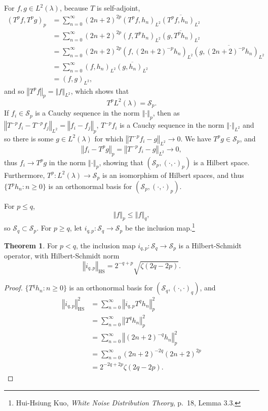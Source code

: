 \documentclass{article}
\newcommand{\norm}[1]{\left\Vert #1 \right\Vert}
\newcommand{\HS}[1]{\left\Vert #1 \right\Vert_{\mathrm{HS}}}
\theoremstyle{definition}
\newtheorem{theorem}{Theorem}
\theoremstyle{definition}
\begin{document}
For $f,g \in L^2(\lambda)$, because $T$ is self-adjoint,
\begin{align*}
(T^p f,T^p g)_p &=\sum_{n=0}^\infty (2n+2)^{2p} (T^p f,h_n)_{L^2} \overline{(T^p f,h_n)_{L^2}}\\
&=\sum_{n=0}^\infty (2n+2)^{2p} (f,T^p h_n)_{L^2} \overline{(g,T^p h_n)_{L^2}}\\
&=\sum_{n=0}^\infty (2n+2)^{2p} (f,(2n+2)^{-p} h_n)_{L^2} \overline{(g,(2n+2)^{-p} h_n)_{L^2}} \\
&=\sum_{n=0}^\infty (f,h_n)_{L^2} \overline{(g,h_n)_{L^2}}\\
&=(f,g)_{L^2},
\end{align*}
and so $\norm{T^p f}_p = \norm{f}_{L^2}$, which shows that 
\[
T^p L^2(\lambda) = \mathscr{S}_p.
\]
If $f_i \in \mathscr{S}_p$ is a Cauchy sequence in the norm $\norm{\cdot}_p$, 
then as $\norm{T^{-p} f_i-T^{-p} f_j}_{L^2}=\norm{f_i-f_j}_p$, 
$T^{-p}f_i$ is a Cauchy sequence in the norm $\norm{\cdot}_{L^2}$ and so there is  some
$g \in L^2(\lambda)$ for which $\norm{T^{-p}f_i-g}_{L^2} \to 0$. We have $T^p g \in \mathscr{S}_p$, and
\[
\norm{f_i-T^p g}_p = \norm{T^{-p} f_i-g}_{L^2} \to 0,
\]
thus $f_i \to T^p g$ in the norm $\norm{\cdot}_p$, showing that 
$(\mathscr{S}_p,(\cdot,\cdot)_p)$ is a Hilbert space. 
Furthermore, $T^p:L^2(\lambda) \to \mathscr{S}_p$ is an isomorphism of Hilbert spaces, and thus
$\{T^p h_n: n \geq 0\}$ is an orthonormal basis for $(\mathscr{S}_p,(\cdot,\cdot)_p)$. 



For $p \leq q$,
\[
\norm{f}_p \leq \norm{f}_q,
\]
so $\mathscr{S}_q \subset \mathscr{S}_p$. 
For $p \geq q$, let $i_{q,p}:\mathscr{S}_q \to \mathscr{S}_p$ be the inclusion
map.\footnote{Hui-Hsiung Kuo, {\em White Noise Distribution Theory}, p.~18, Lemma 3.3.}

\begin{theorem}
For $p < q$, the inclusion map $i_{q,p}:\mathscr{S}_q \to \mathscr{S}_p$ is
a Hilbert-Schmidt operator, with Hilbert-Schmidt norm
\[
\HS{i_{q,p}} = 2^{-q+p} \sqrt{\zeta(2q-2p)}.
\]
\end{theorem}
\begin{proof}
$\{T^q h_n: n \geq 0\}$ is an orthonormal basis for $(\mathscr{S}_q,(\cdot,\cdot)_q)$, and
\begin{align*}
\HS{i_{q,p}}^2&=\sum_{n=0}^\infty \norm{i_{q,p} T^q h_n}_p^2\\
&=\sum_{n=0}^\infty \norm{T^q h_n}_p^2\\
&=\sum_{n=0}^\infty \norm{(2n+2)^{-q} h_n}_p^2\\
&=\sum_{n=0}^\infty (2n+2)^{-2q} (2n+2)^{2p}\\
&=2^{-2q+2p} \zeta(2q-2p).
\end{align*}
\end{proof}
\end{document}
